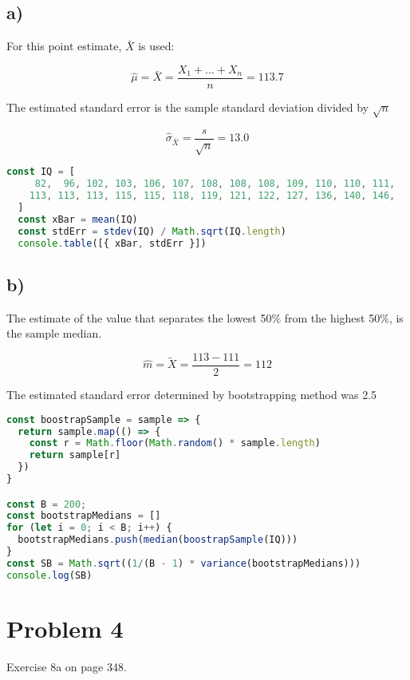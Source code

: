 \documentclass[a4paper,11pt]{article}
\begin{document}
\subsection*{a)}

For this point estimate, $\bar{X}$ is used:

\[ \hat{\mu} = \bar{X} = \frac{X_1 + ... + X_n}{n} = 113.7 \]

The estimated standard error is the sample standard deviation divided by $\sqrt{n}$

\[ \hat{\sigma}_{\bar{X}} = \frac{s}{\sqrt{n}} = 13.0 \]

\begin{lstlisting}[language=JavaScript]
  const IQ = [
     82,  96, 102, 103, 106, 107, 108, 108, 108, 109, 110, 110, 111, 
    113, 113, 113, 115, 115, 118, 119, 121, 122, 127, 136, 140, 146,
  ]
  const xBar = mean(IQ)
  const stdErr = stdev(IQ) / Math.sqrt(IQ.length)
  console.table([{ xBar, stdErr }])
\end{lstlisting}

\subsection*{b)}

The estimate of the value that separates the lowest 50\% from the highest 50\%, is the sample median.

\[ \hat{m} = \tilde{X} = \frac{113 - 111}{2} = 112\]

\vspace{5mm}
The estimated standard error determined by bootstrapping method was 2.5

\begin{lstlisting}[language=JavaScript]
const boostrapSample = sample => {
  return sample.map(() => {
    const r = Math.floor(Math.random() * sample.length)
    return sample[r]
  })
}

const B = 200;
const bootstrapMedians = []
for (let i = 0; i < B; i++) {
  bootstrapMedians.push(median(boostrapSample(IQ)))
}
const SB = Math.sqrt((1/(B - 1) * variance(bootstrapMedians)))
console.log(SB)  
\end{lstlisting}

\clearpage

\section*{Problem 4}

Exercise 8a on page 348.
\end{document}

